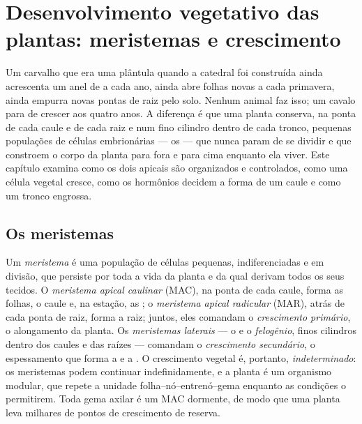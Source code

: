 \chapter{Desenvolvimento vegetativo das plantas: meristemas e crescimento}\label{ch:b2:plant-meristems}

Um carvalho que era uma plântula quando a catedral foi construída
ainda acrescenta um anel de  a cada ano, ainda abre folhas novas
a cada primavera, ainda empurra novas pontas de raiz pelo solo. Nenhum
animal faz isso; um cavalo para de crescer aos quatro anos. A diferença
é que uma planta conserva, na ponta de cada caule e de cada raiz e num
fino cilindro dentro de cada tronco, pequenas populações de células
embrionárias --- os \emph{} --- que nunca param de se dividir
e que constroem o corpo da planta para fora e para cima enquanto ela
viver. Este capítulo examina como os dois  apicais são
organizados e controlados, como uma célula vegetal cresce, como os
hormônios decidem a forma de um caule e como um tronco engrossa.

\section{Os meristemas}

\begin{definition}\label{def:b2:plant-meristems:meristem}
Um \emph{meristema} é uma população de células pequenas,
indiferenciadas e em divisão, que persiste por toda a vida da planta e
da qual derivam todos os seus tecidos. O \emph{meristema apical
caulinar} (MAC), na ponta de cada caule, forma as folhas, o caule e, na
estação, as ; o \emph{meristema apical radicular} (MAR), atrás de
cada ponta de raiz, forma a raiz; juntos, eles comandam o
\emph{crescimento primário}, o alongamento da planta. Os
\emph{meristemas laterais} --- o \emph{} e o
\emph{felogênio}, finos cilindros dentro dos caules e das raízes ---
comandam o \emph{crescimento secundário}, o espessamento que forma a
 e a . O crescimento vegetal é, portanto,
\emph{indeterminado}: os meristemas podem continuar indefinidamente, e
a planta é um organismo modular, que repete a unidade
folha--nó--entrenó--gema enquanto as condições o permitirem. Toda gema
axilar é um MAC dormente, de modo que uma planta leva milhares de
pontos de crescimento de reserva.
\end{definition}

